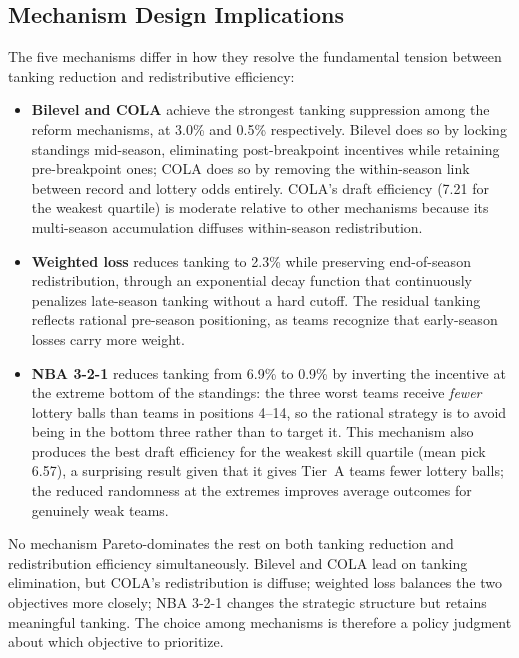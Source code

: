 \documentclass{article}
\begin{document}
\subsection{Mechanism Design Implications}

The five mechanisms differ in how they resolve the fundamental tension between
tanking reduction and redistributive efficiency:
\begin{itemize}
    \item \textbf{Bilevel and COLA} achieve the strongest tanking suppression
    among the reform mechanisms, at 3.0\% and 0.5\% respectively.
    Bilevel does so by locking standings mid-season, eliminating post-breakpoint
    incentives while retaining pre-breakpoint ones; COLA does so by removing
    the within-season link between record and lottery odds entirely.
    COLA's draft efficiency (7.21 for the weakest quartile) is moderate
    relative to other mechanisms because its multi-season accumulation
    diffuses within-season redistribution.
    \item \textbf{Weighted loss} reduces tanking to 2.3\% while preserving
    end-of-season redistribution, through an exponential decay function that
    continuously penalizes late-season tanking without a hard cutoff.
    The residual tanking reflects rational pre-season positioning, as teams
    recognize that early-season losses carry more weight.
    \item \textbf{NBA 3-2-1} reduces tanking from 6.9\% to 0.9\% by inverting
    the incentive at the extreme bottom of the standings: the three worst teams
    receive \emph{fewer} lottery balls than teams in positions 4--14, so the
    rational strategy is to avoid being in the bottom three rather than to
    target it.
    This mechanism also produces the best draft efficiency for the weakest
    skill quartile (mean pick 6.57), a surprising result given that it gives
    Tier~A teams fewer lottery balls; the reduced randomness at the extremes
    improves average outcomes for genuinely weak teams.
\end{itemize}

No mechanism Pareto-dominates the rest on both tanking reduction and
redistribution efficiency simultaneously.
Bilevel and COLA lead on tanking elimination, but COLA's redistribution is
diffuse; weighted loss balances the two objectives more closely; NBA 3-2-1
changes the strategic structure but retains meaningful tanking.
The choice among mechanisms is therefore a policy judgment about which
objective to prioritize.
\end{document}
